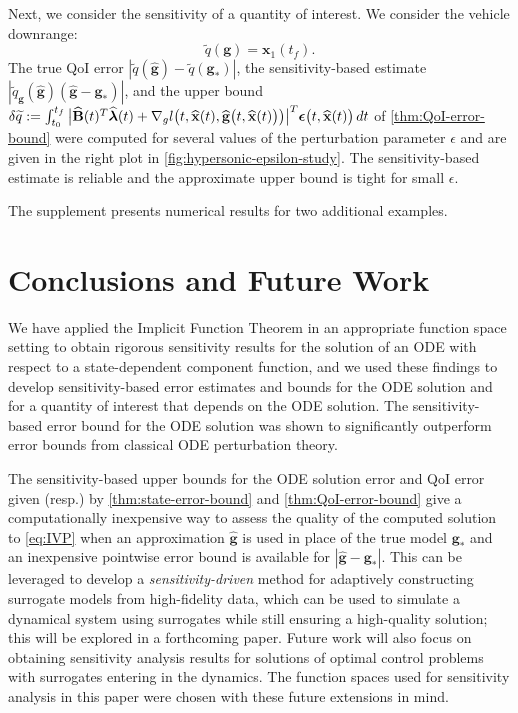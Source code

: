 \documentclass[onefignum,onetabnum]{siamart220329}
\numberwithin{equation}{section}
\newcommand{\bg}{\ensuremath{\mathbf{g}}} %
\newcommand{\bx}{\ensuremath{\mathbf{x}}} %
\newcommand {\bepsilon} {\mbox{\boldmath $\epsilon$}}
\newcommand {\blambda} {\mbox{\boldmath $\lambda$}}
\newcommand{\BB}{\ensuremath{\mathbf{B}} } %
\begin{document}
Next, we consider the sensitivity of a quantity of interest. We consider the vehicle downrange:
\[
	\widetilde{q}(\bg) = \bx_1(t_f).
\]
The true QoI error $| \widetilde{q}(\widehat{\bg}) - \widetilde{q}(\bg_*) |$, the sensitivity-based estimate $| \widetilde{q}_\bg(\widehat{\bg}) (\widehat{\bg} - \bg_*) |$, and the upper bound 
$\delta \widetilde{q} := \int_{t_0}^{t_f}  \big|  \widehat{\BB}(t)^T \widehat{\blambda}(t) + \nabla_g l \big( t, \widehat{\bx}(t), \widehat{\bg} \big( t, \widehat{\bx}(t) \big) \big)  \big|^T  \bepsilon\big( t, \widehat{\bx}(t) \big) \, dt$
 of \cref{thm:QoI-error-bound} were computed for several values of the perturbation parameter $\epsilon$ and are given in the right plot in \cref{fig:hypersonic-epsilon-study}. 
 The sensitivity-based estimate is reliable and the approximate upper bound is tight for small $\epsilon$.
 
 The supplement presents numerical results for two additional examples.


%
\section{Conclusions and Future Work} \label{sec:conclusion}

We have applied the Implicit Function Theorem in an appropriate function space setting to obtain rigorous sensitivity results for the solution of an ODE with respect to a 
state-dependent component function, and we used these findings to develop sensitivity-based error estimates and bounds for the ODE solution and for a quantity of interest that depends on the ODE solution.
The sensitivity-based error bound for the ODE solution was shown to significantly outperform error bounds from classical ODE perturbation theory. 

The sensitivity-based upper bounds for the ODE solution error and QoI error given (resp.) by \cref{thm:state-error-bound} and 
\cref{thm:QoI-error-bound} give a computationally inexpensive way to assess the quality of the computed solution to \eqref{eq:IVP} 
when an approximation $\widehat{\bg}$ is used in place of the true model $\bg_*$ and an inexpensive pointwise error bound is available for $| \widehat{\bg} - \bg_* |$. 
This can be leveraged to develop a \emph{sensitivity-driven} method for adaptively constructing surrogate models from high-fidelity data, which can be used to simulate a dynamical system using surrogates while still ensuring a high-quality solution; this will be explored in a forthcoming paper. Future work will also focus on obtaining sensitivity analysis results for solutions of optimal control problems with surrogates entering in the dynamics. The function spaces used for sensitivity analysis in this paper were chosen with these future extensions in mind.
\end{document}
